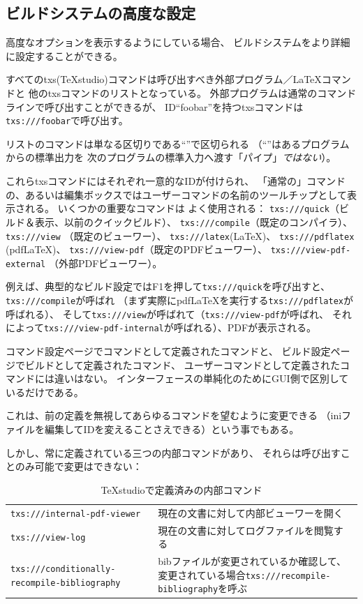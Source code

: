 \subsection{ビルドシステムの高度な設定}\label{subsec:advancemode}

高度なオプションを表示するようにしている場合、
ビルドシステムをより詳細に設定することができる。

すべてのtxs(TeXstudio)コマンドは呼び出すべき外部プログラム／LaTeXコマンドと
他のtxsコマンドのリストとなっている。
外部プログラムは通常のコマンドラインで呼び出すことができるが、
ID``foobar''を持つtxsコマンドは\texttt{txs:///foobar}で呼び出す。

リストのコマンドは単なる区切りである``\textbar{}''で区切られる
（``\textbar{}''はあるプログラムからの標準出力を
次のプログラムの標準入力へ渡す「パイプ」\emph{ではない}）。

これらtxsコマンドにはそれぞれ一意的なIDが付けられ、
「通常の」コマンドの、あるいは編集ボックスではユーザーコマンドの名前のツールチップとして表示される。
いくつかの重要なコマンドは
よく使用される： \texttt{txs:///quick}（ビルド＆表示、以前のクイックビルド）、
 \texttt{txs:///compile}（既定のコンパイラ）、
 \texttt{txs:///view} （既定のビューワー）、 \texttt{txs:///latex}(LaTeX)、
 \texttt{txs:///pdflatex} (pdfLaTeX)、 \texttt{txs:///view-pdf}（既定のPDFビューワー）、
 \texttt{txs:///view-pdf-external} （外部PDFビューワー）。

例えば、典型的なビルド設定ではF1を押して\texttt{txs:///quick}を呼び出すと、
\texttt{txs:///compile}が呼ばれ
（まず実際にpdfLaTeXを実行する\texttt{txs:///pdflatex}が呼ばれる）、
そして\texttt{txs:///view}が呼ばれて（\texttt{txs:///view-pdf}が呼ばれ、
それによって\texttt{txs:///view-pdf-internal}が呼ばれる）、PDFが表示される。

コマンド設定ページでコマンドとして定義されたコマンドと、
ビルド設定ページでビルドとして定義されたコマンド、
ユーザーコマンドとして定義されたコマンドには違いはない。
インターフェースの単純化のためにGUI側で区別しているだけである。

これは、前の定義を無視してあらゆるコマンドを望むように変更できる
（iniファイルを編集してIDを変えることさえできる）という事でもある。

しかし、常に定義されている三つの内部コマンドがあり、
それらは呼び出すことのみ可能で変更はできない：

\begin{table}[H]
  \centering
  \caption{TeXstudioで定義済みの内部コマンド}
  \begin{tabularx}{\linewidth}{lX}
    \hline
    \texttt{txs:///internal-pdf-viewer} & 現在の文書に対して内部ビューワーを開く\\
    \texttt{txs:///view-log} & 現在の文書に対してログファイルを閲覧する\\
    \texttt{txs:///conditionally-recompile-bibliography}
      & bibファイルが変更されているか確認して、
      変更されている場合\texttt{txs:///recompile-bibliography}を呼ぶ\\
    \hline
  \end{tabularx}
\end{table}

